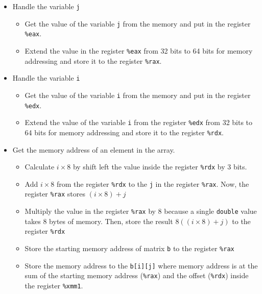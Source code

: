 \documentclass[12pt, a4paper]{article}
\begin{document}
                \begin{itemize}
                    \item Handle the variable \texttt{j}
                    \begin{itemize}
                        \item Get the value of the variable \texttt{j} from the memory and put in the register \texttt{\%eax}.
                        \item Extend the value in the register \texttt{\%eax} from 32 bits to 64 bits for memory addressing
                        and store it to the register \texttt{\%rax}.
                    \end{itemize}
                    \item Handle the variable \texttt{i}
                    \begin{itemize}
                        \item Get the value of the variable \texttt{i} from the memory and put in the register \texttt{\%edx}.
                        \item Extend the value of the variable \texttt{i} from the register \texttt{\%edx} from 32 bits to 64 bits
                        for memory addressing and store it to the register \texttt{\%rdx}.
                    \end{itemize}
                    \item Get the memory address of an element in the array.
                    \begin{itemize}
                        \item Calculate $i \times 8$ by shift left the value inside the register \texttt{\%rdx} by 3 bits.
                        \item Add $i \times 8$ from the register \texttt{\%rdx} to the \texttt{j} in the register \texttt{\%rax}.
                        Now, the register \texttt{\%rax} stores $(i \times 8) + j$
                        \item Multiply the value in the register \texttt{\%rax} by 8 because a single \texttt{double} value takes 8 bytes of memory.
                        Then, store the result $8((i \times 8) + j)$ to the register \texttt{\%rdx}
                        \item Store the starting memory address of matrix \texttt{b} to the register \texttt{\%rax}
                        \item Store the memory address to the \texttt{b[i][j]} where memory address is at the sum of the
                        starting memory address (\texttt{\%rax}) and the offset (\texttt{\%rdx}) inside the register \texttt{\%xmm1}.
                    \end{itemize}
                \end{itemize}
\end{document}
